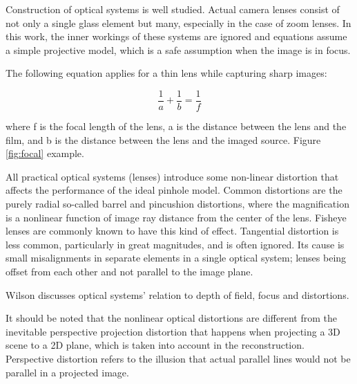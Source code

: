 Construction of optical systems is well studied. \cite{kingslake1989history}
Actual camera lenses consist of not only a single glass element but many, especially in the case of zoom lenses. In this work, the inner workings of these systems are ignored and equations assume a simple projective model, which is a safe assumption when the image is in focus.

The following equation applies for a thin lens while capturing sharp images:

\begin{equation}
	\frac{1}{a} + \frac{1}{b} = \frac{1}{f} \label{eq:focal}
\end{equation}

where f is the focal length of the lens, a is the distance between the lens and the film, and b is the distance between the lens and the imaged source. Figure \ref{fig:focal} example.



All practical optical systems (lenses) introduce some non-linear distortion that affects the performance of the ideal pinhole model.
Common distortions are the purely radial so-called barrel and pincushion distortions, where the magnification is a nonlinear function of image ray distance from the center of the lens. %
Fisheye lenses are commonly known to have this kind of effect.
Tangential distortion is less common, particularly in great magnitudes, and is often ignored. Its cause is small misalignments in separate elements in a single optical system; lenses being offset from each other and not parallel to the image plane. \cite{kingslake1989history}

Wilson \cite{wilson2004anton} discusses optical systems' relation to depth of field, focus and distortions.

It should be noted that the nonlinear optical distortions are different from the inevitable perspective projection distortion that happens when projecting a 3D scene to a 2D plane, which is taken into account in the reconstruction.
Perspective distortion refers to the illusion that actual parallel lines would not be parallel in a projected image. \cite{SOMEONE}

